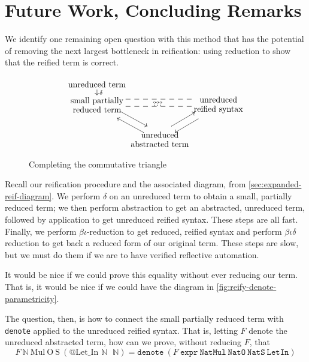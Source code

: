 \section{Future Work, Concluding Remarks} \label{sec:future}

We identify one remaining open question with this method that has the potential of removing the next largest bottleneck in reification: using reduction to show that the reified term is correct.

\begin{figure}
\[
\xymatrix@R=0.5em@C=0em{
    \txt{unreduced term} \ar[d]^{\delta} \\
    \txt{small partially \\ reduced term}
    \ar@<1ex>[ddr]
    \ar@<-1ex>@{--}[rr]
    &&
    \txt{unreduced \\ reified syntax}
    \ar@<-1ex>@{--}[ll]^{???}
    \ar@<1ex>[ddl]
    \\ \\
    &
    \txt{unreduced \\ abstracted term}
    \ar@<1ex>[uul]
    \ar@<1ex>[uur]%
}
\]
\caption{Completing the commutative triangle}\label{fig:reify-denote-parametricity}
\end{figure}
Recall our reification procedure and the associated diagram, from \autoref{sec:expanded-reif-diagram}.
We perform $\delta$ on an unreduced term to obtain a small, partially reduced term;
we then perform abstraction to get an abstracted, unreduced term, followed by application to get unreduced reified syntax.
These steps are all fast.
Finally, we perform $\beta\iota$-reduction to get reduced, reified syntax and perform $\beta\iota\delta$ reduction to get back a reduced form of our original term.
These steps are slow, but we must do them if we are to have verified reflective automation.

It would be nice if we could prove this equality without ever reducing our term.
That is, it would be nice if we could have the diagram in \autoref{fig:reify-denote-parametricity}.

The question, then, is how to connect the small partially reduced term with \texttt{denote} applied to the unreduced reified syntax.
That is, letting $F$ denote the unreduced abstracted term, how can we prove, without reducing $F$, that
\[
F\ \mathbb{N}\ \text{Mul}\ \text{O}\ \text{S}\ (\text{@Let\_In }\mathbb{N}\texttt{ }\mathbb{N})
=
\texttt{denote}\ \left(F\ \texttt{expr}\ \texttt{NatMul}\ \texttt{NatO}\ \texttt{NatS}\ \texttt{LetIn}\right)
\]


